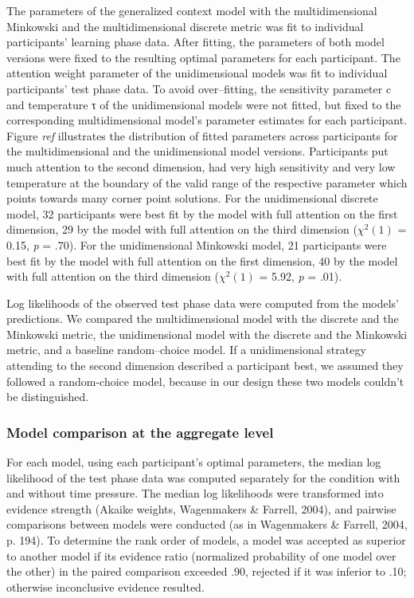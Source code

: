 \documentclass[a4paper,man,natbib]{apa6}
\begin{document}
The parameters of the generalized context model with the multidimensional Minkowski and the multidimensional discrete metric was fit to individual participants’ learning phase data. After fitting, the parameters of both model versions were fixed to the resulting optimal parameters for each participant. The attention weight parameter of the unidimensional models was fit to individual participants’ test phase data. To avoid over--fitting, the sensitivity parameter c and temperature τ of the unidimensional models were not fitted, but fixed to the corresponding multidimensional model’s parameter estimates for each participant. Figure \textit{ref} illustrates the distribution of fitted parameters across participants for the multidimensional and the unidimensional model versions. Participants put much attention to the second dimension, had very high sensitivity and very low temperature at the boundary of the valid range of the respective parameter which points towards many corner point solutions. For the unidimensional discrete model, 32 participants were best fit by the model with full attention on the first dimension, 29 by the model with full attention on the third dimension ($\chi^{2}(1)$ = 0.15, \textit{p} = .70). For the unidimensional Minkowski model, 21 participants were best fit by the model with full attention on the first dimension, 40 by the model with full attention on the third dimension ($\chi^{2}(1)$ = 5.92, \textit{p} = .01).

Log likelihoods of the observed test phase data were computed from the models’ predictions. We compared the multidimensional model with the discrete and the Minkowski metric, the unidimensional model with the discrete and the Minkowski metric, and a baseline random--choice model. If a unidimensional strategy attending to the second dimension described a participant best, we assumed they followed a random-choice model, because in our design these two models couldn't be distinguished. 

\subsubsection{Model comparison at the aggregate level}
For each model, using each participant's optimal parameters, the median log likelihood of the test phase data was computed separately for the condition with and without time pressure. The median log likelihoods were transformed into evidence strength (Akaike weights, Wagenmakers \& Farrell, 2004), and pairwise comparisons between models were conducted (as in Wagenmakers \& Farrell, 2004, p. 194). To determine the rank order of models, a model was accepted as superior to another model if its evidence ratio (normalized probability of one model over the other) in the paired comparison exceeded .90, rejected if it was inferior to .10; otherwise inconclusive evidence resulted. 
\end{document}

